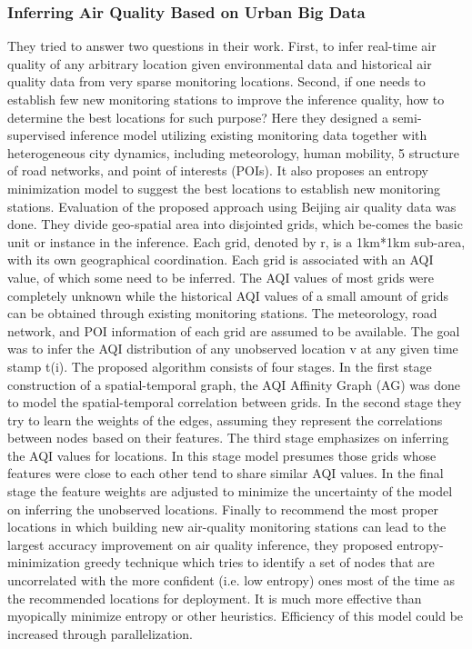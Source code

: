 \subsubsection{Inferring Air Quality Based on Urban Big Data}
They tried to answer two questions in their work. First, to infer real-time air quality of any arbitrary location given environmental data and historical air quality data from very sparse monitoring locations. Second, if one needs to establish few new monitoring stations to improve the inference quality, how to determine the best locations for such purpose? Here they designed a semi-supervised inference model utilizing existing monitoring data together with heterogeneous city dynamics, including meteorology, human mobility, 5 structure of road networks, and point of interests (POIs). It also proposes an entropy minimization model to suggest the best locations to establish new monitoring stations. Evaluation of the proposed approach using Beijing air quality data was done. They divide geo-spatial area into disjointed grids, which be-comes the basic unit or instance in the inference. Each grid, denoted by r, is a 1km*1km sub-area, with its own geographical coordination. Each grid is associated with an AQI value, of which some need to be inferred. The AQI values of most grids were completely unknown while the historical AQI values of a small amount of grids can be obtained through existing monitoring stations. The meteorology, road network, and POI information of each grid are assumed to be available. The goal was to infer the AQI distribution of any unobserved location v at any given time stamp t(i). The proposed algorithm consists of four stages. In the first stage construction of a spatial-temporal graph, the AQI Affinity Graph (AG) was done to model the spatial-temporal correlation between grids. In the second stage they try to learn the weights of the edges, assuming they represent the correlations between nodes based on their features. The third stage emphasizes on inferring the AQI values for locations. In this stage model presumes those grids whose features were close to each other tend to share similar AQI values. In the final stage the feature weights are adjusted to minimize the uncertainty of the model on inferring the unobserved locations. Finally to recommend the most proper locations in which building new air-quality monitoring stations can lead to the largest accuracy improvement on air quality inference, they proposed entropy-minimization greedy technique which tries to identify a set of nodes that are uncorrelated with the more confident (i.e. low entropy) ones most of the time as the recommended locations for deployment. It is much more effective than myopically minimize entropy or other heuristics. Efficiency of this model could be increased through parallelization.


